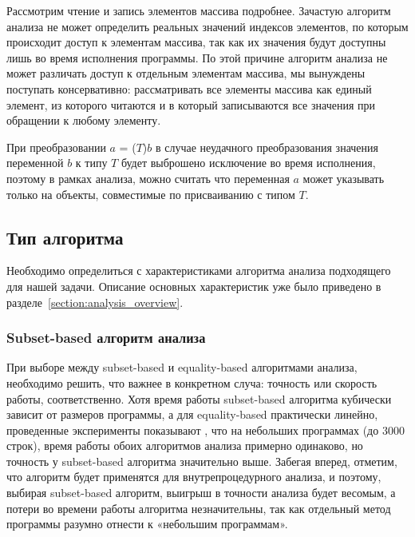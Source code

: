 \documentclass[14pt,titlepage]{extarticle}
\newcommand{\eng}[1]{{\English#1}}
\begin{document}
      Рассмотрим чтение и запись элементов массива подробнее. Зачастую
      алгоритм анализа не может определить реальных значений индексов
      элементов, по которым происходит доступ к элементам массива, так как их
      значения будут доступны лишь во время исполнения программы. По этой
      причине алгоритм анализа не может различать доступ к отдельным элементам
      массива, мы вынуждены поступать консервативно: рассматривать все элементы
      массива как единый элемент, из которого читаются и в который записываются
      все значения при обращении к любому элементу.

      При преобразовании $a$ = ($T$)$b$ в случае неудачного преобразования
      значения переменной $b$ к типу $T$ будет выброшено исключение во время
      исполнения, поэтому в рамках анализа, можно считать что переменная $a$
      может указывать только на объекты, совместимые по присваиванию с типом
      $T$.

    \subsection{Тип алгоритма}

      Необходимо определиться с характеристиками алгоритма анализа
      подходящего для нашей задачи. Описание основных характеристик уже было
      приведено в разделе~\ref{section:analysis_overview}.

    \subsubsection{\eng{Subset-based} алгоритм анализа}

      При выборе между \eng{subset-based} и \eng{equality-based} алгоритмами
      анализа, необходимо решить, что важнее в конкретном случа:
      точность или скорость работы, соответственно.
      Хотя время работы \eng{subset-based} алгоритма кубически зависит от
      размеров программы, а для \eng{equality-based} практически линейно,
      проведенные эксперименты показывают \cite{shapiro_fast_and_accurate}, что
      на небольших программах (до 3000 строк), время работы обоих алгоритмов
      анализа примерно одинаково, но точность у \eng{subset-based} алгоритма
      значительно выше.
      Забегая вперед, отметим, что алгоритм будет применятся для
      внутрепроцедурного анализа, и поэтому, выбирая \eng{subset-based}
      алгоритм, выигрыш в точности анализа будет весомым, а потери во времени
      работы алгоритма незначительны, так как отдельный метод программы
      разумно отнести к «небольшим программам».
\end{document}
